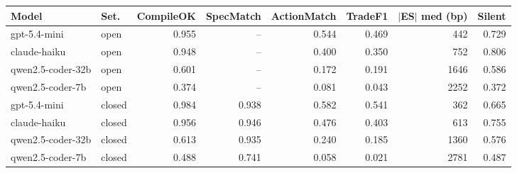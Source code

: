 \begin{tabular}{llrrrrrr}
\toprule
Model & Set. & CompileOK & SpecMatch & ActionMatch & TradeF1 & $|$ES$|$ med (bp) & Silent \\
\midrule
gpt-5.4-mini & open & 0.955 & -- & 0.544 & 0.469 & 442 & 0.729 \\
claude-haiku & open & 0.948 & -- & 0.400 & 0.350 & 752 & 0.806 \\
qwen2.5-coder-32b & open & 0.601 & -- & 0.172 & 0.191 & 1646 & 0.586 \\
qwen2.5-coder-7b & open & 0.374 & -- & 0.081 & 0.043 & 2252 & 0.372 \\
\midrule
gpt-5.4-mini & closed & 0.984 & 0.938 & 0.582 & 0.541 & 362 & 0.665 \\
claude-haiku & closed & 0.956 & 0.946 & 0.476 & 0.403 & 613 & 0.755 \\
qwen2.5-coder-32b & closed & 0.613 & 0.935 & 0.240 & 0.185 & 1360 & 0.576 \\
qwen2.5-coder-7b & closed & 0.488 & 0.741 & 0.058 & 0.021 & 2781 & 0.487 \\
\bottomrule
\end{tabular}
